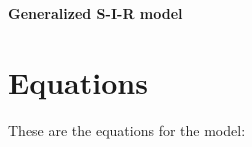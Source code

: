 \documentclass{article}%
\begin{document}
%
\normalsize%
\begin{center}%
\section*{}%
\label{sec:}%
\begin{Large}%
\textbf{Generalized S{-}I{-}R model}%
\end{Large}

%
\end{center}%
\section{Equations}%
\label{sec:Equations}%
\begin{large}%
These are the equations for the model:%
\end{large}
\end{document}
